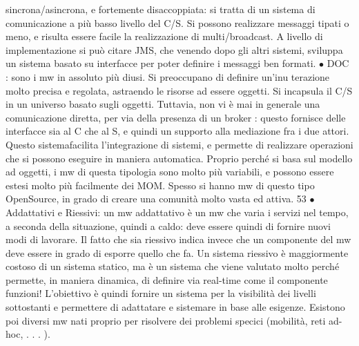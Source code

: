 sincrona/asincrona, e fortemente disaccoppiata: si tratta di un sistema di
comunicazione a più basso livello del C/S. Si possono realizzare messaggi
tipati o meno, e risulta essere facile la realizzazione di multi/broadcast.
A livello di implementazione si può citare JMS, che venendo dopo gli
altri sistemi, sviluppa un sistema basato su interfacce per poter definire i
messaggi ben formati.
$\bullet$ DOC : sono i mw in assoluto più diusi. Si preoccupano di definire un'inu
terazione molto precisa e regolata, astraendo le risorse ad essere oggetti.
Si incapsula il C/S in un universo basato sugli oggetti. Tuttavia, non vi
è mai in generale una comunicazione diretta, per via della presenza di un
broker : questo fornisce delle interfacce sia al C che al S, e quindi un supporto alla mediazione fra i due attori.
Questo sistemafacilita l'integrazione
di sistemi, e permette di realizzare operazioni che si possono eseguire in
maniera automatica.
Proprio perché si basa sul modello ad oggetti, i mw di questa tipologia
sono molto più variabili, e possono essere estesi molto più facilmente dei
MOM. Spesso si hanno mw di questo tipo OpenSource, in grado di creare
una comunità molto vasta ed attiva.
53
$\bullet$ Addattativi e Riessivi: un mw addattativo è un mw che varia i servizi
nel tempo, a seconda della situazione, quindi a caldo: deve essere quindi
di fornire nuovi modi di lavorare.
Il fatto che sia riessivo indica invece che un componente del mw deve essere in grado di esporre quello che fa. Un
sistema riessivo è maggiormente
costoso di un sistema statico, ma è un sistema che viene valutato molto
perché permette, in maniera dinamica, di definire via real-time come il
componente funzioni!
L'obiettivo è quindi fornire un sistema per la visibilità dei livelli sottostanti
e permettere di adattatare e sistemare in base alle esigenze.
Esistono poi diversi mw nati proprio per risolvere dei problemi specici (mobilità, reti ad-hoc, . . . ).
